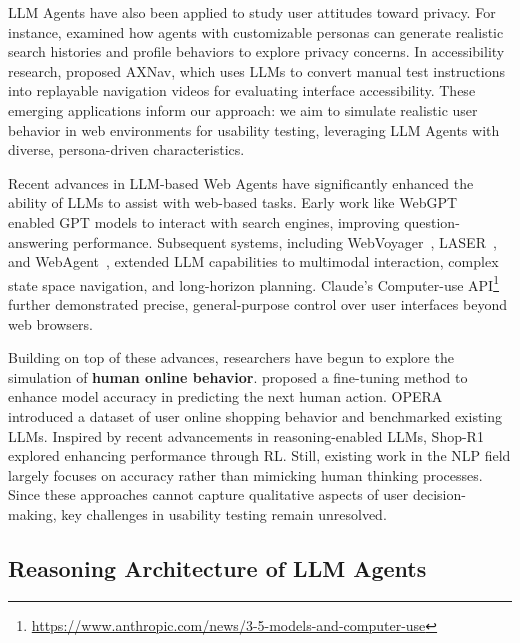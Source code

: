 \documentclass[manuscript,review,anonymous]{acmart}
\begin{document}
LLM Agents have also been applied to study user attitudes toward privacy. For instance, \citet{zhangPrivacyLeakageOvershadowed2025,chenEmpathyBasedSandboxApproach2024} examined how agents with customizable personas can generate realistic search histories and profile behaviors to explore privacy concerns. In accessibility research, \citet{taebAXNavReplayingAccessibility2024} proposed AXNav, which uses LLMs to convert manual test instructions into replayable navigation videos for evaluating interface accessibility.
These emerging applications inform our approach: we aim to simulate realistic user behavior in web environments for usability testing, leveraging LLM Agents with diverse, persona-driven characteristics.

Recent advances in LLM-based Web Agents have significantly enhanced the ability of LLMs to assist with web-based tasks.
Early work like WebGPT~\cite{nakanoWebGPTBrowserassistedQuestionanswering2022} enabled GPT models to interact with search engines, improving question-answering performance. Subsequent systems, including WebVoyager~\cite{heWebVoyagerBuildingEndtoEnd2024}, LASER~\cite{maLASERLLMAgent2024}, and WebAgent~\cite{gurRealWorldWebAgentPlanning2023}, extended LLM capabilities to multimodal interaction, complex state space navigation, and long-horizon planning. Claude’s Computer-use API\footnote{\url{https://www.anthropic.com/news/3-5-models-and-computer-use}} further demonstrated precise, general-purpose control over user interfaces beyond web browsers.

Building on top of these advances, researchers have begun to explore the simulation of \textbf{human online behavior}. \citet{luPromptingNotAll2025} proposed a fine-tuning method to enhance model accuracy in predicting the next human action. OPERA~\cite{wangOPeRADatasetObservation2025} introduced a dataset of user online shopping behavior and benchmarked existing LLMs. Inspired by recent advancements in reasoning-enabled LLMs, Shop-R1~\cite{zhangShopR1RewardingLLMs2025} explored enhancing performance through RL. Still, existing work in the NLP field largely focuses on accuracy rather than mimicking human thinking processes. Since these approaches cannot capture qualitative aspects of user decision-making, key challenges in usability testing remain unresolved.

\subsection{Reasoning Architecture of LLM Agents}
\end{document}
